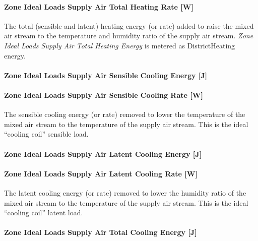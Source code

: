 \paragraph{Zone Ideal Loads Supply Air Total Heating Rate {[}W{]}}\label{zone-ideal-loads-supply-air-total-heating-rate-w}

The total (sensible and latent) heating energy (or rate) added to raise the mixed air stream to the temperature and humidity ratio of the supply air stream. \emph{Zone Ideal Loads Supply Air Total Heating Energy} is metered as DistrictHeating energy.

\paragraph{Zone Ideal Loads Supply Air Sensible Cooling Energy {[}J{]}}\label{zone-ideal-loads-supply-air-sensible-cooling-energy-j}

\paragraph{Zone Ideal Loads Supply Air Sensible Cooling Rate {[}W{]}}\label{zone-ideal-loads-supply-air-sensible-cooling-rate-w}

The sensible cooling energy (or rate) removed to lower the temperature of the mixed air stream to the temperature of the supply air stream. This is the ideal ``cooling coil'' sensible load.

\paragraph{Zone Ideal Loads Supply Air Latent Cooling Energy {[}J{]}}\label{zone-ideal-loads-supply-air-latent-cooling-energy-j}

\paragraph{Zone Ideal Loads Supply Air Latent Cooling Rate {[}W{]}}\label{zone-ideal-loads-supply-air-latent-cooling-rate-w}

The latent cooling energy (or rate) removed to lower the humidity ratio of the mixed air stream to the temperature of the supply air stream. This is the ideal ``cooling coil'' latent load.

\paragraph{Zone Ideal Loads Supply Air Total Cooling Energy {[}J{]}}\label{zone-ideal-loads-supply-air-total-cooling-energy-j}

